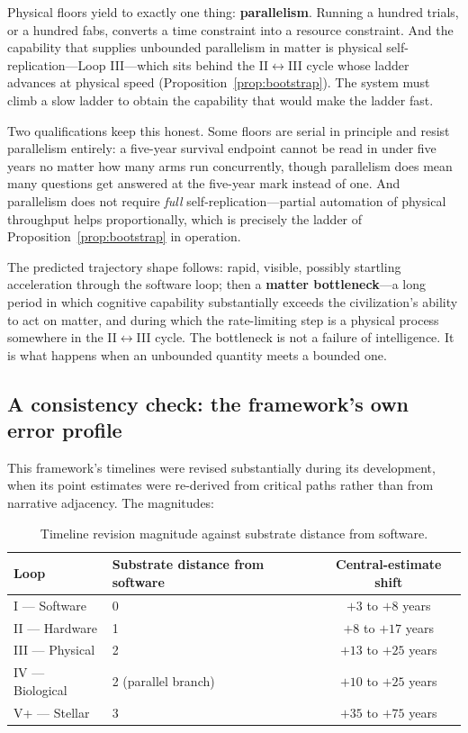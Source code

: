 \documentclass[11pt]{article}
\begin{document}
Physical floors yield to exactly one thing: \textbf{parallelism}. Running a hundred trials, or a hundred fabs, converts a time constraint into a resource constraint. And the capability that supplies unbounded parallelism in matter is physical self-replication---Loop III---which sits behind the II$\leftrightarrow$III cycle whose ladder advances at physical speed (Proposition~\ref{prop:bootstrap}). The system must climb a slow ladder to obtain the capability that would make the ladder fast.

Two qualifications keep this honest. Some floors are serial in principle and resist parallelism entirely: a five-year survival endpoint cannot be read in under five years no matter how many arms run concurrently, though parallelism does mean many questions get answered at the five-year mark instead of one. And parallelism does not require \emph{full} self-replication---partial automation of physical throughput helps proportionally, which is precisely the ladder of Proposition~\ref{prop:bootstrap} in operation.

The predicted trajectory shape follows: rapid, visible, possibly startling acceleration through the software loop; then a \textbf{matter bottleneck}---a long period in which cognitive capability substantially exceeds the civilization's ability to act on matter, and during which the rate-limiting step is a physical process somewhere in the II$\leftrightarrow$III cycle. The bottleneck is not a failure of intelligence. It is what happens when an unbounded quantity meets a bounded one.

\subsection{A consistency check: the framework's own error profile}

This framework's timelines were revised substantially during its development, when its point estimates were re-derived from critical paths rather than from narrative adjacency. The magnitudes:

\begin{table}[h]
\centering
\footnotesize
\begin{tabular}{@{}llc@{}}
\toprule
Loop & Substrate distance from software & Central-estimate shift \\
\midrule
I --- Software   & 0                    & $+3$ to $+8$ years \\
II --- Hardware  & 1                    & $+8$ to $+17$ years \\
III --- Physical & 2                    & $+13$ to $+25$ years \\
IV --- Biological& 2 (parallel branch)  & $+10$ to $+25$ years \\
V+ --- Stellar   & 3                    & $+35$ to $+75$ years \\
\bottomrule
\end{tabular}
\caption{Timeline revision magnitude against substrate distance from software.}
\end{table}
\end{document}
